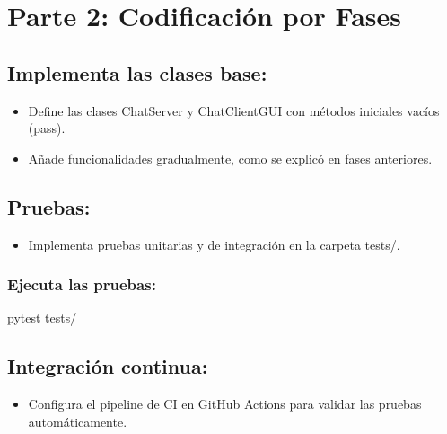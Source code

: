 \documentclass[
  a4paper,
  DIV=11,
  numbers=noendperiod,
  onepage,
  openany]{scrreprt}
\newenvironment{Shaded}{\begin{snugshade}}{\end{snugshade}}
\newcommand{\ExtensionTok}[1]{\textcolor[rgb]{0.00,0.23,0.31}{#1}}
\newcommand{\NormalTok}[1]{\textcolor[rgb]{0.00,0.23,0.31}{#1}}
\providecommand{\tightlist}{%
  \setlength{\itemsep}{0pt}\setlength{\parskip}{0pt}}\usepackage{longtable,booktabs,array}
\begin{document}
\chapter{\texorpdfstring{\textbf{Parte 2}: Codificación por
Fases}{Parte 2: Codificación por Fases}}\label{parte-2-codificaciuxf3n-por-fases}

\section{Implementa las clases base:}\label{implementa-las-clases-base}

\begin{itemize}
\tightlist
\item
  Define las clases ChatServer y ChatClientGUI con métodos iniciales
  vacíos (pass).
\item
  Añade funcionalidades gradualmente, como se explicó en fases
  anteriores.
\end{itemize}

\section{Pruebas:}\label{pruebas-4}

\begin{itemize}
\tightlist
\item
  Implementa pruebas unitarias y de integración en la carpeta tests/.
\end{itemize}

\subsection{Ejecuta las pruebas:}\label{ejecuta-las-pruebas}

\begin{Shaded}
\begin{Highlighting}[]
\ExtensionTok{pytest}\NormalTok{ tests/}
\end{Highlighting}
\end{Shaded}

\section{Integración continua:}\label{integraciuxf3n-continua-1}

\begin{itemize}
\tightlist
\item
  Configura el pipeline de CI en GitHub Actions para validar las pruebas
  automáticamente.
\end{itemize}
\end{document}
